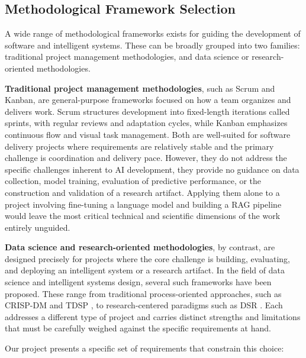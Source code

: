 \subsection{Methodological Framework Selection}

A wide range of methodological frameworks exists for guiding the development of 
software and intelligent systems. These can be broadly grouped into two families: 
traditional project management methodologies, and data science or research-oriented 
methodologies.

\textbf{Traditional project management methodologies}, such as Scrum and Kanban, 
are general-purpose frameworks focused on how a team organizes and delivers work. 
Scrum structures development into fixed-length iterations called sprints, with 
regular reviews and adaptation cycles, while Kanban emphasizes continuous flow and 
visual task management. Both are well-suited for software delivery projects where 
requirements are relatively stable and the primary challenge is coordination and 
delivery pace. However, they do not address the specific challenges inherent to 
\ac{AI} development, they provide no guidance on data collection, model training, 
evaluation of predictive performance, or the construction and validation of a 
research artifact. Applying them alone to a project involving fine-tuning a language 
model and building a \ac{RAG} pipeline would leave the most critical technical and 
scientific dimensions of the work entirely unguided.

\textbf{Data science and research-oriented methodologies}, by contrast, are designed 
precisely for projects where the core challenge is building, evaluating, and 
deploying an intelligent system or a research artifact. In the field of data science 
and intelligent systems design, several such frameworks have been proposed. These 
range from traditional process-oriented approaches, such as \ac{CRISP-DM} 
\cite{chapman2000crispdm} and \ac{TDSP} \cite{microsoft2016tdsp}, to 
research-centered paradigms such as \ac{DSR} \cite{hevner2004design, peffers2007dsrm}. 
Each addresses a different type of project and carries distinct strengths and 
limitations that must be carefully weighed against the specific requirements at hand.

Our project presents a specific set of requirements that constrain this choice:

